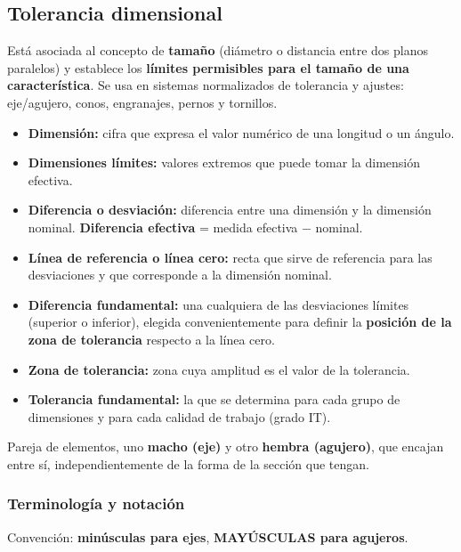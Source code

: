 \documentclass[12pt,a4paper]{article}
\begin{document}
\subsection{Tolerancia dimensional}
Está asociada al concepto de \textbf{tamaño} (diámetro o distancia entre dos
planos paralelos) y establece los \textbf{límites permisibles para el tamaño de
	una característica}. Se usa en sistemas normalizados de tolerancia y ajustes:
eje/agujero, conos, engranajes, pernos y tornillos.

\begin{itemize}
	\item \textbf{Dimensión:} cifra que expresa el valor numérico de una longitud
	      o un ángulo.
	\item \textbf{Dimensiones límites:} valores extremos que puede tomar la
	      dimensión efectiva.
	\item \textbf{Diferencia o desviación:} diferencia entre una dimensión y la
	      dimensión nominal. \textbf{Diferencia efectiva} = medida efectiva $-$
	      nominal.
	\item \textbf{Línea de referencia o línea cero:} recta que sirve de referencia
	      para las desviaciones y que corresponde a la dimensión nominal.
	\item \textbf{Diferencia fundamental:} una cualquiera de las desviaciones
	      límites (superior o inferior), elegida convenientemente para definir la
	      \textbf{posición de la zona de tolerancia} respecto a la línea cero.
	\item \textbf{Zona de tolerancia:} zona cuya amplitud es el valor de la
	      tolerancia.
	\item \textbf{Tolerancia fundamental:} la que se determina para cada grupo de
	      dimensiones y para cada calidad de trabajo (grado IT).
\end{itemize}

\begin{defi}
	Pareja de elementos, uno \textbf{macho (eje)} y otro \textbf{hembra
		(agujero)}, que encajan entre sí, independientemente de la forma de la
	sección
	que tengan.
\end{defi}

\subsubsection{Terminología y notación}
Convención: \textbf{minúsculas para ejes}, \textbf{MAYÚSCULAS para agujeros}.
\end{document}
